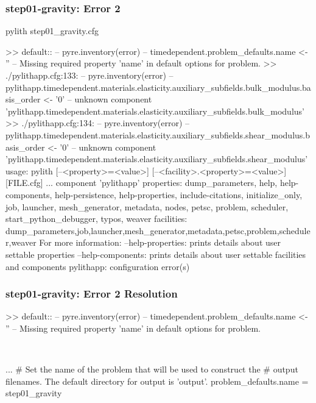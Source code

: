 \documentclass[aspectratio=169]{beamer}
\begin{document}
\begin{frame}[fragile]
  \frametitle{{\ttfamily step01-gravity}: Error 2}

\begin{bashcode}
pylith step01_gravity.cfg

 >> {default}::
 -- pyre.inventory(error)
 -- timedependent.problem_defaults.name <- ''
 -- Missing required property 'name' in default options for problem.
 >> ./pylithapp.cfg:133:
 -- pyre.inventory(error)
 -- pylithapp.timedependent.materials.elasticity.auxiliary_subfields.bulk_modulus.basis_order <- '0'
 -- unknown component 'pylithapp.timedependent.materials.elasticity.auxiliary_subfields.bulk_modulus'
 >> ./pylithapp.cfg:134:
 -- pyre.inventory(error)
 -- pylithapp.timedependent.materials.elasticity.auxiliary_subfields.shear_modulus.basis_order <- '0'
 -- unknown component 'pylithapp.timedependent.materials.elasticity.auxiliary_subfields.shear_modulus'
usage: pylith [--<property>=<value>] [--<facility>.<property>=<value>] [FILE.cfg] ...
component 'pylithapp'
    properties: dump_parameters, help, help-components, help-persistence, help-properties, include-citations, initialize_only, job, launcher, mesh_generator, metadata, nodes, petsc, problem, scheduler, start_python_debugger, typos, weaver
    facilities: dump_parameters,job,launcher,mesh_generator,metadata,petsc,problem,scheduler,weaver
For more information:
  --help-properties: prints details about user settable properties
  --help-components: prints details about user settable facilities and components
pylithapp: configuration error(s)
\end{bashcode}

\end{frame}


\begin{frame}[t,fragile]
  \frametitle{{\ttfamily step01-gravity}: Error 2 Resolution}

  \tserror
  \begin{bashcode}
    >> {default}::
    -- pyre.inventory(error)
    -- timedependent.problem_defaults.name <- ''
    -- Missing required property 'name' in default options for problem.
  \end{bashcode}

  \pause\\[1pt]

  \begin{cfgcode}
    [pylithapp]
    ...
    # Set the name of the problem that will be used to construct the
    # output filenames. The default directory for output is 'output'.
    problem_defaults.name = step01_gravity
  \end{cfgcode}

\end{frame}
\end{document}
